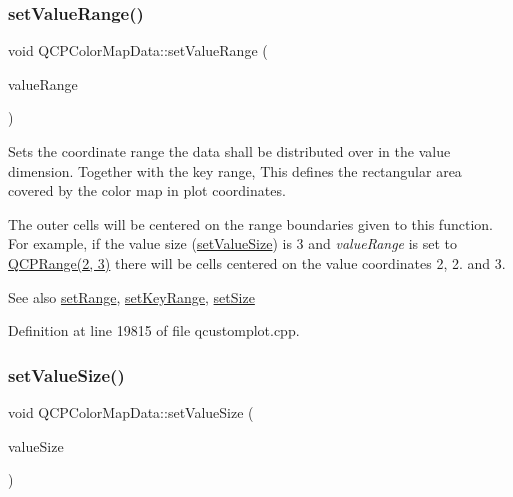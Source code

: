 \subsubsection{\texorpdfstring{set\+Value\+Range()}{setValueRange()}}
{\footnotesize\ttfamily void Q\+C\+P\+Color\+Map\+Data\+::set\+Value\+Range (\begin{DoxyParamCaption}\item[{const \hyperlink{class_q_c_p_range}{Q\+C\+P\+Range} \&}]{value\+Range }\end{DoxyParamCaption})}

Sets the coordinate range the data shall be distributed over in the value dimension. Together with the key range, This defines the rectangular area covered by the color map in plot coordinates.

The outer cells will be centered on the range boundaries given to this function. For example, if the value size (\hyperlink{class_q_c_p_color_map_data_a0893c9e3914513048b45e3429ffd16f2}{set\+Value\+Size}) is 3 and {\itshape value\+Range} is set to {\ttfamily \hyperlink{class_q_c_p_range}{Q\+C\+P\+Range(2, 3)}} there will be cells centered on the value coordinates 2, 2. and 3.

\begin{DoxySeeAlso}{See also}
\hyperlink{class_q_c_p_color_map_data_aad9c1c7c703c1339489fc730517c83d4}{set\+Range}, \hyperlink{class_q_c_p_color_map_data_a0738c485f3c9df9ea1241b7a8bb6a86e}{set\+Key\+Range}, \hyperlink{class_q_c_p_color_map_data_a0d9ff35c299d0478b682bfbcdd9c097e}{set\+Size} 
\end{DoxySeeAlso}


Definition at line 19815 of file qcustomplot.\+cpp.

\mbox{\label{class_q_c_p_color_map_data_a0893c9e3914513048b45e3429ffd16f2}} 
\subsubsection{\texorpdfstring{set\+Value\+Size()}{setValueSize()}}
{\footnotesize\ttfamily void Q\+C\+P\+Color\+Map\+Data\+::set\+Value\+Size (\begin{DoxyParamCaption}\item[{int}]{value\+Size }\end{DoxyParamCaption})}

